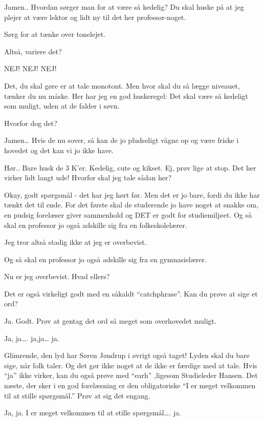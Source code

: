 \documentclass[a4paper,11pt]{article}
\begin{document}
\begin{sketch}
 Jamen.. Hvordan sørger man for at være så kedelig? Du skal huske på at jeg plejer at være lektor og lidt ny til det her professor-noget.

 Sørg for at tænke over tonelejet.

 Altså, variere det?

 NEJ! NEJ! NEJ!

 Det, du skal gøre er at tale monotont. Men hvor skal du så lægge niveauet, tænker du nu måske. Her har jeg en god huskeregel: Det skal være så kedeligt som muligt, uden at de falder i søvn.

 Hvorfor dog det?

  Jamen… Hvis de nu sover, så kan de jo pludseligt vågne op og være friske i hovedet og det kan vi jo ikke have.

 Hør..
 Bare husk de 3 K’er. Kedelig, cute og kikset.
 Ej, prøv lige at stop. Det her virker lidt langt ude! Hvorfor skal jeg tale sådan her? 

 Okay, godt spørgsmål - det har jeg hørt før. Men det er jo bare, fordi du ikke har tænkt det til ende.
For det første skal de studerende jo have noget at snakke om, en pudsig forelæser giver sammenhold og DET er godt for studiemiljøet.
Og så skal en professor jo også adskille sig fra en folkeskolelærer.

 Jeg tror altså stadig ikke at jeg er overbevist.

 Og så skal en professor jo også adskille sig fra en gymnasielærer.

 Nu er jeg overbevist. Hvad ellers?

 Det er også virkeligt godt med en såkaldt “catchphrase”. Kan du prøve at sige et ord?

 Ja.
Godt. Prøv at gentag det ord så meget som overhovedet muligt.

 Ja, ja…. ja,ja… ja. 

 Glimrende, den lyd har Søren Jøndrup i øvrigt også taget! Lyden skal du bare sige, når folk taler. Og det gør ikke noget at de ikke er færdige med at tale. Hvis “ja” ikke virker, kan du også prøve med “earh” ,ligesom Studieleder Hansen.
Det næste, der sker i en god forelæsning er den obligatoriske “I er meget velkommen til at stille spørgsmål.” Prøv at sig det engang.

 Ja, ja. I er meget velkommen til at stille spørgsmål…. ja.


\end{sketch}
\end{document}
